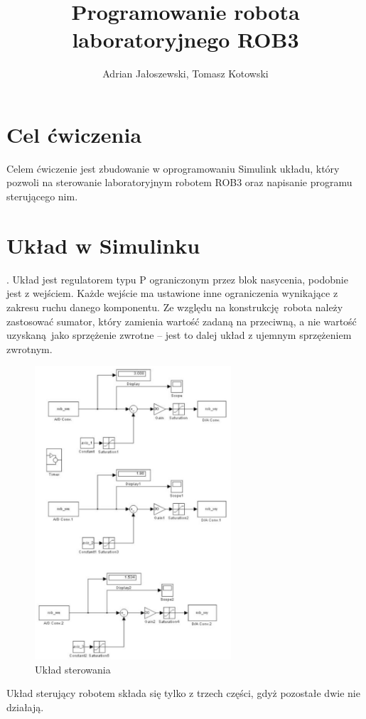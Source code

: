 \documentclass[a4paper, 12pt, titlepage]{article}
\title{Programowanie robota laboratoryjnego ROB3}
\author{Adrian Jałoszewski, Tomasz Kotowski}
\date{}
\begin{document}
	\maketitle
	\section{Cel ćwiczenia}
		Celem ćwiczenie jest zbudowanie w oprogramowaniu Simulink układu, który pozwoli na sterowanie laboratoryjnym robotem ROB3 oraz napisanie programu sterującego nim.
	\section{Układ w Simulinku}.
		Układ jest regulatorem typu P ograniczonym przez blok nasycenia, podobnie jest z wejściem. Każde wejście ma ustawione inne ograniczenia wynikające z zakresu ruchu danego komponentu. Ze względu na konstrukcję robota należy zastosować sumator, który zamienia wartość zadaną na przeciwną, a nie wartość uzyskaną jako sprzężenie zwrotne -- jest to dalej układ z ujemnym sprzężeniem zwrotnym.
		\begin{figure}[H]
			\centering
			\includegraphics[width=0.65\textwidth]{img/system.png}
			\caption{Układ sterowania}
		\end{figure} \noindent
		Układ sterujący robotem składa się tylko z trzech części, gdyż pozostałe dwie nie działają.
\end{document}
